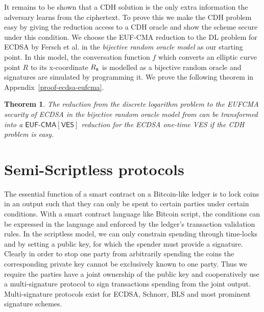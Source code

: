 \documentclass[fullpage]{article}
\newtheorem{theorem}{Theorem}[section]
\theoremstyle{definition}
\newcommand{\EUFCMA}{\textsf{EUF-CMA}\xspace}
\newcommand{\EUFCMAVES}{\textsf{EUF-CMA}[\textsf{VES}]\xspace}
\newcommand{\hatsigma}{\hat{\sigma}}
\newcommand{\DLOG}{\textsf{DL}\xspace}
\begin{document}
It remains to be shown that a CDH solution is the only extra information the adversary learns from the ciphertext. To prove this we make the CDH problem easy by giving the reduction access to a CDH oracle and show the scheme secure under this condition. We choose the \EUFCMA reduction to the \DLOG problem for ECDSA by Fersch et al.\cite{ecdsa-eufcma} in the \emph{bijective random oracle model} as our starting point. In this model, the conversation function $f$ which converts an elliptic curve point $R$ to its x-coordinate $R_\texttt{x}$ is modelled as a bijective random oracle and signatures are simulated by programming it. We prove the following theorem in Appendix~\ref{proof-ecdsa-eufcma}.

\begin{theorem}
\label{claim-ecdsa-eufcma}
The reduction from the discrete logarithm problem to the EUFCMA security of ECDSA in the bijective random oracle model from \cite{ecdsa-eufcma} can be transformed into a $\EUFCMAVES$ reduction for the ECDSA one-time VES if the CDH problem is easy.
\end{theorem}

\section{Semi-Scriptless protocols}
\label{semi-scriptless}

\newcommand{\TxFund}{\texttt{Tx}_{\textsf{fund}}}
\newcommand{\TxRefund}{\texttt{Tx}_{\textsf{refund}}}
\newcommand{\TxRedeem}{\texttt{Tx}_{\textsf{redeem}}}
\newcommand{\TxInput}{\texttt{Tx}_{\textsf{input}}}
\newcommand{\addrRedeem}{addr_{B}}
\newcommand{\addrRefund}{addr_{A}}
\newcommand{\TxGen}{\textsf{Tx}}
\newcommand{\refundSig}{\sigma_{\textsf{refund}}}
\newcommand{\redeemSig}{\sigma_{\textsf{redeem}}}
\newcommand{\redeemEncSig}{\hatsigma_{\textsf{redeem}}}

The essential function of a smart contract on a Bitcoin-like ledger is to lock coins in an output such that they can only be spent to certain parties under certain conditions. With a smart contract language like Bitcoin script, the conditions can be expressed in the language and enforced by the ledger's transaction validation rules. In the scriptless model, we can only constrain spending through time-locks and by setting a public key, for which the spender must provide a signature. Clearly in order to stop one party from arbitrarily spending the coins the corresponding private key cannot be exclusively known to one party. Thus we require the parties have a joint ownership of the public key and cooperatively use a multi-signature protocol to sign transactions spending from the joint output. Multi-signature protocols exist for ECDSA\cite{Lindell2pECDSA,hash-proof-ecdsa}, Schnorr\cite{musig}, BLS\cite{compact-blockchains-bls} and most prominent signature schemes.
\end{document}
